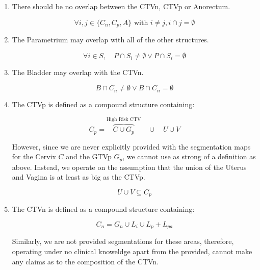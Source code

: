 \documentclass[12pt,twoside]{report}
\begin{document}
\begin{enumerate}
  \item There should be no overlap between the CTVn, CTVp or Anorectum.

        \begin{equation}
          \forall{i,j \in \{C_n, C_p, A\}}\text{ with } i \neq j, i \cap j = \emptyset
        \end{equation}

  \item The Parametrium may overlap with all of the other structures.

        \begin{equation}
          \forall i \in S, \quad P \cap S_i \neq \emptyset \vee P \cap S_i = \emptyset
        \end{equation}

  \item The Bladder may overlap with the CTVn.

        \begin{equation}
          B \cap C_n \neq \emptyset \vee B \cap C_n = \emptyset\label{eq:ctvn}
        \end{equation}

  \item The CTVp is defined as a compound structure containing:

        \begin{equation}
          C_p = \overbrace{C \cup G_p}^{\text{High Risk CTV}} \quad \cup \quad U \cup V\label{eq:ctvp1}
        \end{equation}

  However, since we are never explicitly provided with the segmentation maps for the Cervix $C$ and the GTVp $G_p$, we cannot use as strong of a definition as above. Instead, we operate on the assumption that the union of the Uterus and Vagina is at least as big as the CTVp.

        \begin{equation}
          U \cup V \subseteq C_p\label{eq:ctvp2}
        \end{equation}

  \item The CTVn is defined as a compound structure containing:

        \begin{equation}
          C_n = G_n \cup L_i \cup L_p + L_{pa}
        \end{equation}

  Similarly, we are not provided segmentations for these areas, therefore, operating under no clinical knoweldge apart from the provided, cannot make any claims as to the composition of the CTVn.

\end{enumerate}
\end{document}
